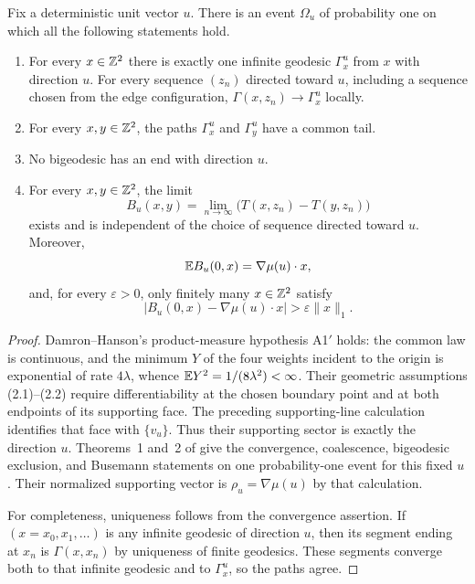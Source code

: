 \begin{corollary}\label{cor:fixed-direction}
Fix a deterministic unit vector $u$. There is an event $\Omega_u$ of
probability one on which all the following statements hold.
\begin{enumerate}
\item For every $x\in\mathbb Z^2$ there is exactly one infinite geodesic
      $\Gamma_x^u$ from $x$ with direction $u$. For every sequence $(z_n)$
      directed toward $u$, including a sequence chosen from the edge
      configuration,
      $\Gamma(x,z_n)\to\Gamma_x^u$ locally.
\item For every $x,y\in\mathbb Z^2$, the paths $\Gamma_x^u$ and
      $\Gamma_y^u$ have a common tail.
\item No bigeodesic has an end with direction $u$.
\item For every $x,y\in\mathbb Z^2$, the limit
\[
 B_u(x,y)=\lim_{n\to\infty}\bigl(T(x,z_n)-T(y,z_n)\bigr)
\]
      exists and is independent of the choice of sequence directed toward
      $u$. Moreover,
\[
 \mathbb E B_u(0,x)=\nabla\mu(u)\cdot x,
\]
      and, for every $\varepsilon>0$, only finitely many $x\in\mathbb Z^2$
      satisfy
\[
 |B_u(0,x)-\nabla\mu(u)\cdot x|>\varepsilon\lVert x\rVert_1.
\]
\end{enumerate}
\end{corollary}

\begin{proof}
Damron--Hanson's product-measure hypothesis A1$'$ holds: the common law
is continuous, and the minimum $Y$ of the four weights incident to the
origin is exponential of rate $4\lambda$, whence
$\mathbb E Y^2=1/(8\lambda^2)<\infty$.
Their geometric assumptions (2.1)--(2.2) require differentiability at
the chosen boundary point and at both endpoints of its supporting face.
The preceding supporting-line calculation identifies that face with
$\{v_u\}$. Thus their supporting sector is exactly the direction $u$.
Theorems~1 and~2 of \cite{DH2017} give the convergence, coalescence,
bigeodesic exclusion, and Busemann statements on one probability-one
event for this fixed $u$. Their normalized supporting vector is
$\rho_u=\nabla\mu(u)$ by that calculation.

For completeness, uniqueness follows from the convergence assertion.
If $(x=x_0,x_1,\ldots)$ is any infinite geodesic of direction $u$, then
its segment ending at $x_n$ is $\Gamma(x,x_n)$ by uniqueness of finite
geodesics. These segments converge both to that infinite geodesic and
to $\Gamma_x^u$, so the paths agree.
\end{proof}

